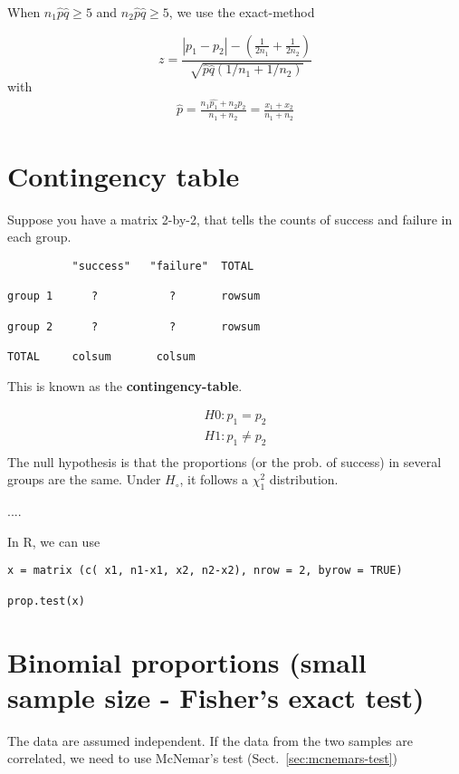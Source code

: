 When $n_1\hat{p}\hat{q}\ge 5$ and $n_2\hat{p}\hat{q}\ge 5$, we use the
exact-method

\begin{equation}
  \label{eq:95}
  z = \frac{|p_1-p_2|-(\frac{1}{2n_1}+\frac{1}{2n_2})}{\sqrt{\hat{p}\hat{q}(1/n_1+1/n_2)}}
\end{equation}
with
\begin{eqnarray*}
  \hat{p} = \frac{n_1\hat{p_1}+n_2\hat{p_2}}{n_1+n_2}=\frac{x_1+x_2}{n_1+n_2}
\end{eqnarray*}


\section{Contingency table}
\label{sec:contingency-table}

Suppose you have a matrix 2-by-2, that tells the counts of success and
failure in each group.
\begin{verbatim}
          "success"   "failure"  TOTAL
 
group 1      ?           ?       rowsum
 
group 2      ?           ?       rowsum

TOTAL     colsum       colsum
\end{verbatim}
This is known as the {\bf contingency-table}. 


\begin{eqnarray*}
  H0: p_1 = p_2 \\
  H1: p_1 \ne p_2 \\
\end{eqnarray*}
The null hypothesis is that the proportions (or the prob. of success)
in several groups are the same. Under $H_\circ$, it follows a
$\chi_1^2$ distribution. 

....

In R, we can use
\begin{lstlisting}
x = matrix (c( x1, n1-x1, x2, n2-x2), nrow = 2, byrow = TRUE)

prop.test(x)
\end{lstlisting}

\section[Fisher's exact test]{Binomial proportions (small sample size
  - Fisher's exact test)}
\label{sec:binom-prop-small}

The data are assumed independent. If the data from the two samples are
correlated, we need to use McNemar's test (Sect.~\ref{sec:mcnemars-test})


